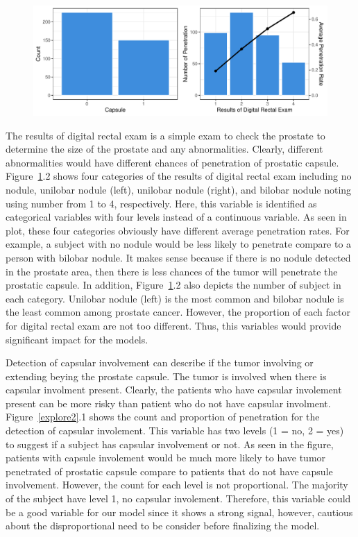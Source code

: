 \documentclass[11pt]{article}\usepackage[]{graphicx}\usepackage[]{color}
\makeatletter
\def\maxwidth{ %
  \ifdim\Gin@nat@width>\linewidth
    \linewidth
  \else
    \Gin@nat@width
  \fi
}
\makeatother
\begin{document}
\begin{figure}[h!] 
\begin{center}

\includegraphics[width=\maxwidth]{figure/unnamed-chunk-1-1} 

\caption{}
\label{explore1}
\end{center} 
\end{figure}

\noindent The results of digital rectal exam is a simple exam to check the prostate to determine the size of the prostate and any abnormalities. Clearly, different abnormalities would have different chances of penetration of prostatic capsule. Figure~\ref{explore1}.2 shows four categories of the results of digital rectal exam including no nodule, unilobar nodule (left), unilobar nodule (right), and bilobar nodule noting using number from 1 to 4, respectively. Here, this variable is identified as categorical variables with four levels instead of a continuous variable. As seen in plot, these four categories obviously have different average penetration rates. For example, a subject with no nodule would be less likely to penetrate compare to a person with bilobar nodule. It makes sense because if there is no nodule detected in the prostate area, then there is less chances of the tumor will penetrate the prostatic capsule. In addition, Figure~\ref{explore1}.2 also depicts the number of subject in each category. Unilobar nodule (left) is the most common and bilobar nodule is the least common among prostate cancer. However, the proportion of each factor for digital rectal exam are not too different. Thus, this variables would provide significant impact for the models.   
\hfill \break

\noindent Detection of capsular involvement can describe if the tumor involving or extending beying the prostate capsule. The tumor is involved when there is capsular involment present. Clearly, the patients who have capsular involement present can be more risky than patient who do not have capsular involment. Figure~\ref{explore2}.1 shows the count and proportion of penetration for the detection of capsular involement. This variable has two levels (1 = no, 2 = yes) to suggest if a subject has capsular involvement or not. As seen in the figure, patients with capsule involement would be much more likely to have tumor penetrated of prostatic capsule compare to patients that do not have capsule involvement. However, the count for each level is not proportional. The majority of the subject have level 1, no capsular involement. Therefore, this variable could be a good variable for our model since it shows a strong signal, however, cautious about the disproportional need to be consider before finalizing the model.      
\end{document}
